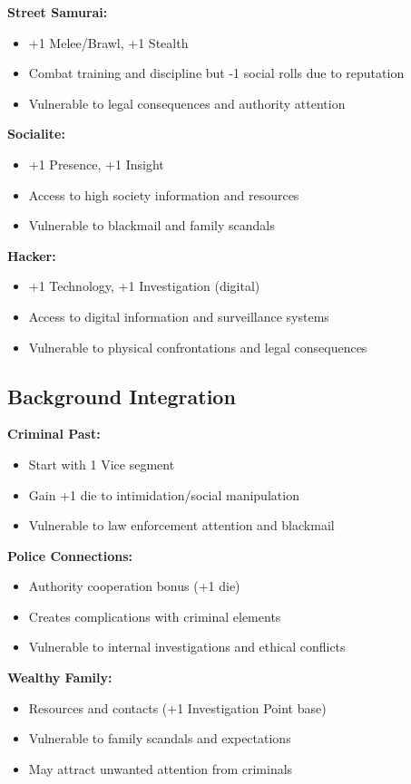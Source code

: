 \documentclass[11pt]{article}
\begin{document}
\textbf{Street Samurai:}
\begin{itemize}
\item +1 Melee/Brawl, +1 Stealth
\item Combat training and discipline but -1 social rolls due to reputation
\item Vulnerable to legal consequences and authority attention
\end{itemize}

\textbf{Socialite:}
\begin{itemize}
\item +1 Presence, +1 Insight
\item Access to high society information and resources
\item Vulnerable to blackmail and family scandals
\end{itemize}

\textbf{Hacker:}
\begin{itemize}
\item +1 Technology, +1 Investigation (digital)
\item Access to digital information and surveillance systems
\item Vulnerable to physical confrontations and legal consequences
\end{itemize}

\subsection{Background Integration}

\textbf{Criminal Past:}
\begin{itemize}
\item Start with 1 Vice segment
\item Gain +1 die to intimidation/social manipulation
\item Vulnerable to law enforcement attention and blackmail
\end{itemize}

\textbf{Police Connections:}
\begin{itemize}
\item Authority cooperation bonus (+1 die)
\item Creates complications with criminal elements
\item Vulnerable to internal investigations and ethical conflicts
\end{itemize}

\textbf{Wealthy Family:}
\begin{itemize}
\item Resources and contacts (+1 Investigation Point base)
\item Vulnerable to family scandals and expectations
\item May attract unwanted attention from criminals
\end{itemize}
\end{document}
